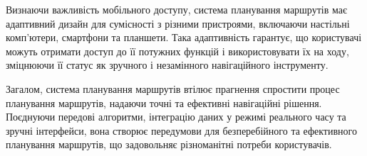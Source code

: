 Визнаючи важливість мобільного доступу, система планування маршрутів має адаптивний дизайн для сумісності з різними пристроями, включаючи настільні комп'ютери, смартфони та планшети. Така адаптивність гарантує, що користувачі можуть отримати доступ до її потужних функцій і використовувати їх на ходу, зміцнюючи її статус як зручного і незамінного навігаційного інструменту.

Загалом, система планування маршрутів втілює прагнення спростити процес планування маршрутів, надаючи точні та ефективні навігаційні рішення. Поєднуючи передові алгоритми, інтеграцію даних у режимі реального часу та зручні інтерфейси, вона створює передумови для безперебійного та ефективного планування маршрутів, що задовольняє різноманітні потреби користувачів.








